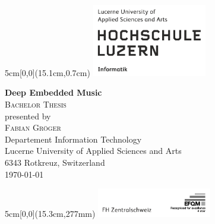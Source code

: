 \begin{titlepage}
	\begin{textblock*}{5cm}[0,0](15.1cm,0.7cm)
		\includegraphics[keepaspectratio,width=5cm]{img/HSLU_Logo}
	\end{textblock*}
	\begin{center}
		\vspace*{5cm}
		\Huge{\textbf{Deep Embedded Music}} \\
		\vspace{0.5em}
		\LARGE{\textsc{Bachelor Thesis}}\\
		\vspace{2em}
		\Large{presented by}\\
		\LARGE{\textsc{Fabian Gröger}}\\
		\vspace{2em}
		\Large{Departement Information Technology}\\
		\Large{Lucerne University of Applied Sciences and Arts}\\
		\Large{6343 Rotkreuz, Switzerland}\\
		\vspace{4em}
		\Large{\today}\\
		\vfill
		\begin{center}
        \end{center}
	\end{center}
	\begin{textblock*}{5cm}[0,0](15.3cm,277mm)
		\includegraphics[keepaspectratio,width=5cm]{img/FHZ_Logo}
	\end{textblock*}
\end{titlepage}

\newpage